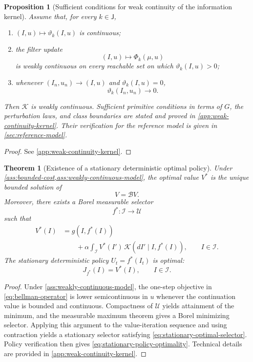 \documentclass[10pt,twocolumn]{article}
\newtheorem{theorem}{Theorem}
\newtheorem{proposition}{Proposition}
\theoremstyle{remark}
\newcommand{\Ucal}{\mathcal{U}}
\newcommand{\Ical}{\mathcal{I}}
\begin{document}
\begin{proposition}[Sufficient conditions for weak continuity of the information kernel]
	\label{prop:sufficient-weak-continuity}
	Assume that, for every \(k\in\mathsf J\),
	\begin{enumerate}[label=\textnormal{(\roman*)},leftmargin=*]
		\item \((I,u)\mapsto\vartheta_k(I,u)\) is continuous;
		\item the filter update
		\[
		(I,u)\longmapsto
		\Phi_k(\mu,u)
		\]
		is weakly continuous on every reachable set on which
		\(\vartheta_k(I,u)>0\);
		\item whenever \((I_n,u_n)\to(I,u)\) and
		\(\vartheta_k(I,u)=0\),
		\[
		\vartheta_k(I_n,u_n)\longrightarrow0.
		\]
	\end{enumerate}
	Then \(\mathcal K\) is weakly continuous. Sufficient primitive conditions in terms of \(G\), the perturbation laws, and class boundaries are stated and proved in \cref{app:weak-continuity-kernel}. Their verification for the reference model is given in \cref{sec:reference-model}.
\end{proposition}

\begin{proof}
	See \cref{app:weak-continuity-kernel}.
\end{proof}

\begin{theorem}[Existence of a stationary deterministic optimal policy]
	\label{thm:stationary-optimal-policy}
	Under \cref{ass:bounded-cost,ass:weakly-continuous-model}, the optimal value \(V^*\) is the unique bounded solution of
	\[
	V=\mathcal BV.
	\]
	Moreover, there exists a Borel measurable selector
	\[
	f^*:\Ical\longrightarrow\Ucal
	\]
	such that
	\begin{equation}
		\begin{aligned}
			V^*(I)
			&=
			g(I,f^*(I))
			\\
			&\qquad +
			\alpha
			\int_{\Ical}
			V^*(I')\,
			\mathcal K(dI'\mid I,f^*(I)),
			\qquad I\in\Ical.
		\end{aligned}
		\label{eq:stationary-optimal-selector}
	\end{equation}
	The stationary deterministic policy \(U_t=f^*(I_t)\) is optimal:
	\begin{equation}
		J_{f^*}(I)=V^*(I),
		\qquad I\in\Ical.
		\label{eq:stationary-policy-optimality}
	\end{equation}
\end{theorem}

\begin{proof}
	Under \cref{ass:weakly-continuous-model}, the one-step objective in \cref{eq:bellman-operator} is lower semicontinuous in \(u\) whenever the continuation value is bounded and continuous. Compactness of \(\Ucal\) yields attainment of the minimum, and the measurable maximum theorem gives a Borel minimizing selector. Applying this argument to the value-iteration sequence and using contraction yields a stationary selector satisfying \cref{eq:stationary-optimal-selector}. Policy verification then gives \cref{eq:stationary-policy-optimality}. Technical details are provided in \cref{app:weak-continuity-kernel}.
\end{proof}
\end{document}
